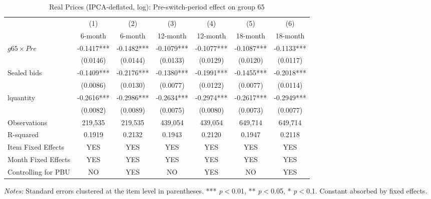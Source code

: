 \begin{table}[htbp]
\centering
\caption{Real Prices (IPCA-deflated, log): Pre-switch-period effect on group 65}
\label{tab:prices_real}
\begin{adjustbox}{max width=\textwidth}
\begin{threeparttable}
\small
\begin{tabular}{lcccccc}
\toprule
 & (1) & (2) & (3) & (4) & (5) & (6) \\
 & 6-month & 6-month & 12-month & 12-month & 18-month & 18-month \\
\midrule
$g65 \times Pre$ & -0.1417*** & -0.1482*** & -0.1079*** & -0.1077*** & -0.1087*** & -0.1133*** \\
 & (0.0146) & (0.0144) & (0.0133) & (0.0129) & (0.0120) & (0.0117) \\
Sealed bids & -0.1409*** & -0.2176*** & -0.1380*** & -0.1991*** & -0.1455*** & -0.2018*** \\
 & (0.0086) & (0.0130) & (0.0077) & (0.0122) & (0.0077) & (0.0114) \\
lquantity & -0.2616*** & -0.2986*** & -0.2634*** & -0.2974*** & -0.2617*** & -0.2949*** \\
 & (0.0082) & (0.0089) & (0.0075) & (0.0080) & (0.0073) & (0.0077) \\
\midrule
Observations & 219,535 & 219,535 & 439,054 & 439,054 & 649,714 & 649,714 \\
R-squared & 0.1919 & 0.2132 & 0.1943 & 0.2120 & 0.1947 & 0.2118 \\
Item Fixed Effects & YES & YES & YES & YES & YES & YES \\
Month Fixed Effects & YES & YES & YES & YES & YES & YES \\
Controlling for PBU & NO & YES & NO & YES & NO & YES \\
\bottomrule
\end{tabular}
\begin{tablenotes}
\small
\item \textit{Notes:} Standard errors clustered at the item level in parentheses.
*** \textit{p}$<$0.01, ** \textit{p}$<$0.05, * \textit{p}$<$0.1.
Constant absorbed by fixed effects.
\end{tablenotes}
\end{threeparttable}
\end{adjustbox}
\end{table}
